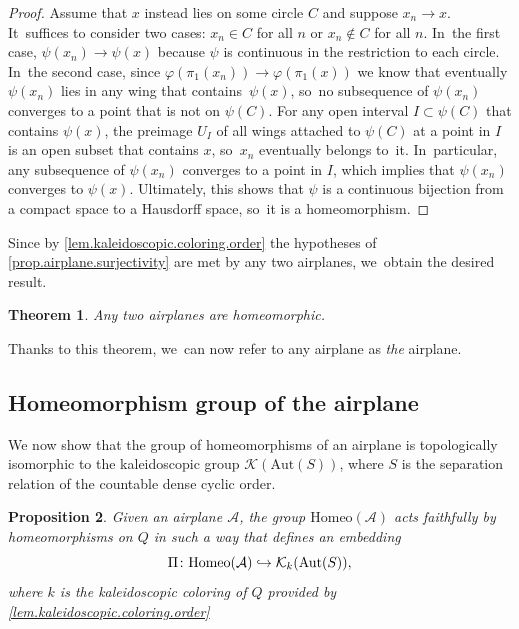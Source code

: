 \documentclass[JEP,XML,SOM,Unicode,NoFloatCountersInSection,published]{cedram}
\newcommand\hto{\mathrel{\lhook\joinrel\to}}
\theoremstyle{plain}
\newtheorem{theorem}{Theorem}[section]
\newtheorem{proposition}[theorem]{Proposition}
\theoremstyle{definition}
\theoremstyle{remark}
\newcommand{\Aut}{\mathrm{Aut}}
\newcommand{\Homeo}{\mathrm{Homeo}}
\newcommand{\A}{\mathcal{A}}
\newcommand{\K}{\mathcal{K}}
\begin{document}
\begin{proof}
Assume that $x$ instead lies on some circle $C$ and suppose $x_n \to x$. It~suffices to consider two cases:
$x_n \in C$ for all $n$ or $x_n \notin C$ for all $n$. In~the first case, \hbox{$\psi(x_n)\to\psi(x)$} because $\psi$ is continuous in the restriction to each circle. In~the second case, since $\varphi(\pi_1(x_n)) \to \varphi(\pi_1(x))$ we know that eventually $\psi(x_n)$ lies in any wing that contains~$\psi(x)$, so~no subsequence of $\psi(x_n)$ converges to a point that is not on $\psi(C)$.
For any open interval $I \subset \psi(C)$ that contains $\psi(x)$, the preimage $U_I$ of all wings attached to $\psi(C)$ at a point in $I$ is an open subset that contains $x$, so~$x_n$ eventually belongs to~it. In~particular, any subsequence of $\psi(x_n)$ converges to a point in $I$, which implies that $\psi(x_n)$ converges to $\psi(x)$.
Ultimately, this shows that $\psi$ is a continuous bijection from a compact space to a Hausdorff space, so~it is a homeomorphism.
\end{proof}

Since by \cref{lem.kaleidoscopic.coloring.order} the hypotheses of \cref{prop.airplane.surjectivity} are met by any two airplanes, we~obtain the desired result.

\begin{theorem}
\label{thm.uniqueness.airplane}
Any two airplanes are homeomorphic.
\end{theorem}

Thanks to this theorem, we~can now refer to any airplane as \textit{the} airplane.

\subsection{Homeomorphism group of the airplane}
\label{sub.airplane.homeo.group.is.kaleidoscopic}

We now show that the group of homeomorphisms of an airplane is topologically isomorphic to the kaleidoscopic group $\K(\Aut(S))$, where $S$ is the separation relation of the countable dense cyclic order.

\begin{proposition}
\label{prop.homeo.airplane.acts.on.dendrite}
Given an airplane $\A$, the group $\Homeo(\A)$ acts faithfully by homeomorphisms on $Q$ in such a way that defines an embedding
\[
 \Pi \colon \Homeo(\A) \hto \K_k (\Aut(S)), 
\]
where $k$ is the kaleidoscopic coloring of $Q$ provided by \cref{lem.kaleidoscopic.coloring.order}
\end{proposition}
\end{document}
